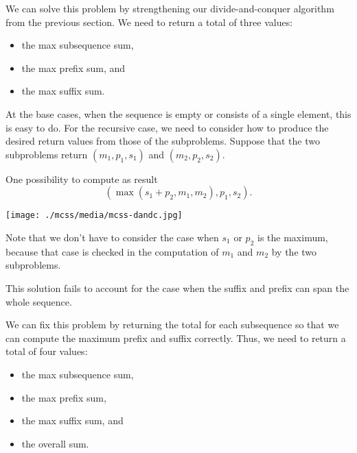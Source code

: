 \begin{gram}
We can solve this problem by strengthening our divide-and-conquer
algorithm from the previous section.
%
We need to return a total of three values: 
\begin{itemize}
\item the max subsequence sum,
%
\item the max prefix sum, and
%
\item the max suffix sum.
\end{itemize}
%

At the base cases, when the sequence is empty or consists of a single
element, this is easy to do.
%
For the recursive case, we need to consider how to produce the desired
return values from those of the subproblems.
Suppose that the two subproblems return  $(m_1, p_1, s_1)$ and $(m_2, p_2, s_2)$.

One possibility to compute as result
\[
  (\max(s_1+p_2, m_1, m_2), p_1, s_2).
\]


\texttt{[image: ./mcss/media/mcss-dandc.jpg]}


Note that we don't have to consider the case when $s_1$ or $p_2$ is
the maximum, because that case is checked in the computation of $m_1$
and $m_2$ by the two subproblems.
%


This solution fails to account for the case when the suffix and
prefix can span the whole sequence.
%
%

We can fix this problem by returning the total for each subsequence so
that we can compute the maximum prefix and suffix correctly.  Thus, we
need to return a total of four values: 
\begin{itemize}
\item the max subsequence sum,
\item the
max prefix sum, 
\item the max suffix sum, and 
\item the overall sum.
\end{itemize}
%


\end{gram}
